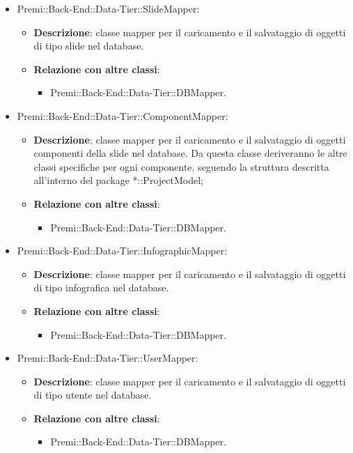 \begin{itemize}
			\item Premi::Back-End::Data-Tier::SlideMapper:
			\begin{itemize}
				\item \textbf{Descrizione}: classe mapper per il caricamento e il salvataggio di oggetti di tipo slide nel database.
				\item \textbf{Relazione con altre classi}:
				\begin{itemize}
					\item Premi::Back-End::Data-Tier::DBMapper.
				\end{itemize}
			\end{itemize}
			
			\item Premi::Back-End::Data-Tier::ComponentMapper:
			\begin{itemize}
				\item \textbf{Descrizione}: classe mapper per il caricamento e il salvataggio di oggetti componenti della slide nel database. Da questa classe deriveranno le altre classi specifiche per ogni componente, seguendo la struttura descritta all'interno del package *::ProjectModel;
				\item \textbf{Relazione con altre classi}:
				\begin{itemize}
					\item Premi::Back-End::Data-Tier::DBMapper.
				\end{itemize}
			\end{itemize}
			
			\item Premi::Back-End::Data-Tier::InfographicMapper:
			\begin{itemize}
				\item \textbf{Descrizione}: classe mapper per il caricamento e il salvataggio di oggetti di tipo infografica nel database.
				\item \textbf{Relazione con altre classi}:
				\begin{itemize}
					\item Premi::Back-End::Data-Tier::DBMapper.
				\end{itemize}
			\end{itemize}
			
			\item Premi::Back-End::Data-Tier::UserMapper:
			\begin{itemize}
				\item \textbf{Descrizione}: classe mapper per il caricamento e il salvataggio di oggetti di tipo utente nel database.
				\item \textbf{Relazione con altre classi}:
				\begin{itemize}
					\item Premi::Back-End::Data-Tier::DBMapper.
				\end{itemize}
			\end{itemize}
		\end{itemize}
		

